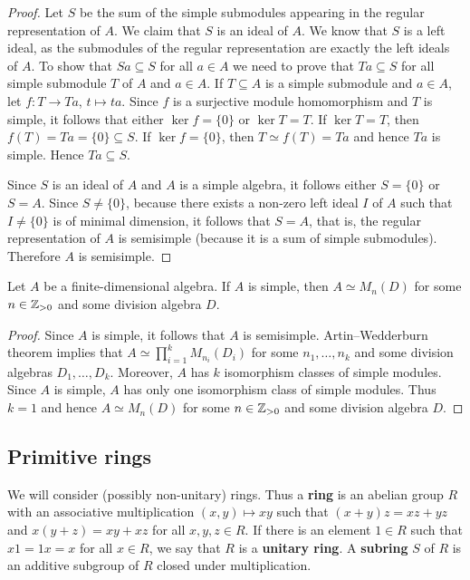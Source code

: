 \begin{proof}
	Let $S$ be the sum of the simple submodules appearing in the regular representation of $A$. 
	We claim that $S$ is an ideal of $A$. We know that $S$ is a left ideal, as the submodules of the regular representation
	are exactly the left ideals of $A$. To show that $Sa\subseteq S$ for all $a\in A$ we need to prove that 
	$Ta\subseteq S$ for all simple submodule $T$ of $A$ and $a\in A$. 
	If $T\subseteq A$ is a simple submodule and $a\in A$, 
	let $f\colon T\to Ta$, $t\mapsto ta$. Since $f$ is a surjective 
	module homomorphism and $T$ is simple, it follows that
	either $\ker f=\{0\}$ or $\ker T=T$. If $\ker T=T$, then 
	$f(T)=Ta=\{0\}\subseteq S$. If $\ker f=\{0\}$, then $T\simeq f(T)=Ta$ and hence $Ta$ is simple. Hence $Ta\subseteq S$. 
	
	Since $S$ is an ideal of $A$ and $A$
	is a simple algebra, it follows either $S=\{0\}$ or $S=A$.  Since $S\ne\{0\}$, because  
	there exists a non-zero left ideal $I$ of $A$ such that $I\ne\{0\}$ is of minimal dimension, 
	it follows that $S=A$, that is, the regular representation of $A$ is semisimple (because it is a sum of simple submodules). Therefore 
	$A$ is semisimple. 
\end{proof}

\begin{theorem}[Wedderburn]
	Let $A$ be a finite-dimensional algebra. If $A$ is simple, then 
	$A\simeq M_n(D)$ for some $n\in\mathbb{Z}_{>0}$ and some division algebra $D$. 
\end{theorem}

\begin{proof}
	Since $A$ is simple, it follows that $A$ is semisimple. Artin--Wedderburn theorem implies that $A\simeq\prod_{i=1}^k M_{n_i}(D_i)$ 
	for some $n_1,\dots,n_k$ and some division algebras $D_1,\dots,D_k$. Moreover, $A$ has 
	$k$ isomorphism classes of simple modules. Since $A$ is simple,
	$A$ has only one isomorphism class of simple modules. Thus $k=1$ and hence 
	$A\simeq M_n(D)$ for some $n\in\mathbb{Z}_{>0}$ and some division algebra $D$. 
\end{proof}

\subsection{Primitive rings}
\label{Primitive rings}

We will consider (possibly non-unitary) rings. Thus  
a \textbf{ring} is an abelian group $R$ with an associative multiplication 
$(x,y)\mapsto xy$ such that $(x+y)z=xz+yz$ and $x(y+z)=xy+xz$ for all $x,y,z\in
R$. If there is an element $1\in R$ such that $x1=1x=x$ for all $x\in R$, we 
say that $R$ is a \textbf{unitary ring}.  A \textbf{subring} $S$ of $R$ is an additive
subgroup of $R$ closed under multiplication. 


